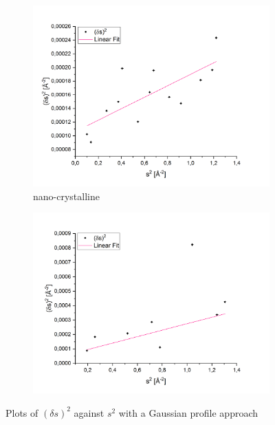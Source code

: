 \documentclass[12pt]{article}
\begin{document}
\begin{figure}[!ht]
    \begin{subfigure}{0.5\textwidth}
        \centering
        \includegraphics[width=\textwidth]{2_XRD/Graphics/Experiments/Gaussian Broadening/GaussianBroadening_CeO2_2.png}
        \caption{nano-crystalline }
    \end{subfigure}
    \begin{subfigure}{0.5\textwidth}
        \centering
        \includegraphics[width=\textwidth]{2_XRD/Graphics/Experiments/Gaussian Broadening/GaussianBroadening_Pd90Au10.png}
        \caption{}
    \end{subfigure}
    \caption{Plots of $(\delta s)^2$ against $s^2$ with a Gaussian profile approach}
    \label{fig:GaussianStrainSize}
\end{figure}
\FloatBarrier
\end{document}
